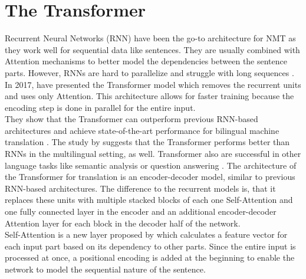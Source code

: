 \documentclass[article,accentcolor=tud8d,bibliography=totoc]{tudreport}
\begin{document}
\section{The Transformer}
Recurrent Neural Networks (RNN) have been the go-to architecture for NMT as they work well for sequential data like sentences.
They are usually combined with Attention mechanisms to better model the dependencies between the sentence parts.
However, RNNs are hard to parallelize and struggle with long sequences \autocite{DBLP:journals/corr/WuSCLNMKCGMKSJL16}.\\
In 2017, \textcite{DBLP:journals/corr/VaswaniSPUJGKP17} have presented the Transformer model which removes the recurrent units and uses only Attention.
This architecture allows for faster training because the encoding step is done in parallel for the entire input.\\
They show that the Transformer can outperform previous RNN-based architectures and achieve state-of-the-art performance for bilingual machine translation \autocite{DBLP:journals/corr/VaswaniSPUJGKP17}.
The study by \textcite{DBLP:journals/corr/abs-1806-06957} suggests that the Transformer performs better than RNNs in the multilingual setting, as well.
Transformer also are successful in other language tasks like semantic analysis or question answering \autocite{DBLP:journals/corr/abs-1810-04805}.
The architecture of the Transformer for translation is an encoder-decoder model, similar to previous RNN-based architectures.
The difference to the recurrent models is, that it replaces these units with multiple stacked blocks of each one Self-Attention and one fully connected layer in the encoder and an additional encoder-decoder Attention layer for each block in the decoder half of the network.\\
Self-Attention is a new layer proposed by \textcite{DBLP:journals/corr/VaswaniSPUJGKP17} which calculates a feature vector for each input part based on its dependency to other parts.
Since the entire input is processed at once, a positional encoding is added at the beginning to enable the network to model the sequential nature of the sentence.
\end{document}
